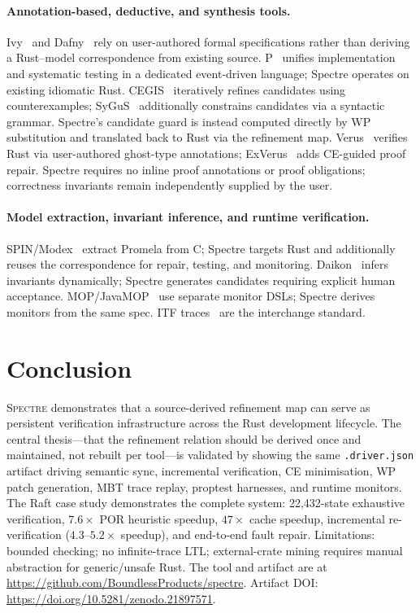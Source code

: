 \documentclass[runningheads]{../paper-vmcai-2027/llncs}
\begin{document}
\paragraph{Annotation-based, deductive, and synthesis tools.}
Ivy~\cite{22_padon2016ivy} and Dafny~\cite{18_leino2010dafny} rely on
user-authored formal specifications rather than deriving a Rust--model
correspondence from existing source.
P~\cite{6_desai2013p} unifies implementation and systematic testing in a
dedicated event-driven language; Spectre operates on existing idiomatic Rust.
CEGIS~\cite{24_solarlezama2008program} iteratively refines candidates using
counterexamples; SyGuS~\cite{1_alur2013sygus} additionally constrains candidates
via a syntactic grammar. Spectre's candidate guard is instead computed directly
by WP substitution and translated back to Rust via the refinement map.
Verus~\cite{17_lattuada2023verus} verifies Rust via user-authored ghost-type
annotations; ExVerus~\cite{25_yang2026exverus} adds CE-guided proof repair.
Spectre requires no inline proof annotations or proof obligations; correctness
invariants remain independently supplied by the user.

\paragraph{Model extraction, invariant inference, and runtime verification.}
SPIN/Modex~\cite{9_holzmann2003spin,10_holzmann2001modex} extract Promela from C;
Spectre targets Rust and additionally reuses the correspondence for repair,
testing, and monitoring.
Daikon~\cite{8_ernst2007daikon} infers invariants dynamically; Spectre generates
candidates requiring explicit human acceptance.
MOP/JavaMOP~\cite{3_chen2007mop,14_jin2012javamop} use separate monitor DSLs;
Spectre derives monitors from the same spec.
ITF traces~\cite{11_informal2022itf} are the interchange standard.

\section{Conclusion}\label{sec:conclusion}

\textsc{Spectre} demonstrates that a source-derived refinement map can serve
as persistent verification infrastructure across the Rust development lifecycle.
The central thesis---that the refinement relation should be derived once and
maintained, not rebuilt per tool---is validated by showing the same
\texttt{.driver.json} artifact driving semantic sync, incremental verification,
CE minimisation, WP patch generation, MBT trace replay, proptest harnesses,
and runtime monitors.
The Raft case study demonstrates the complete system: 22{,}432-state exhaustive
verification, $7.6\times$ POR heuristic speedup, $47\times$ cache speedup,
incremental re-verification ($4.3$--$5.2\times$ speedup), and end-to-end fault repair.
Limitations: bounded checking; no infinite-trace LTL; external-crate mining
requires manual abstraction for generic/unsafe Rust.
The tool and artifact are at \url{https://github.com/BoundlessProducts/spectre}.
Artifact DOI: \url{https://doi.org/10.5281/zenodo.21897571}.



\end{document}
